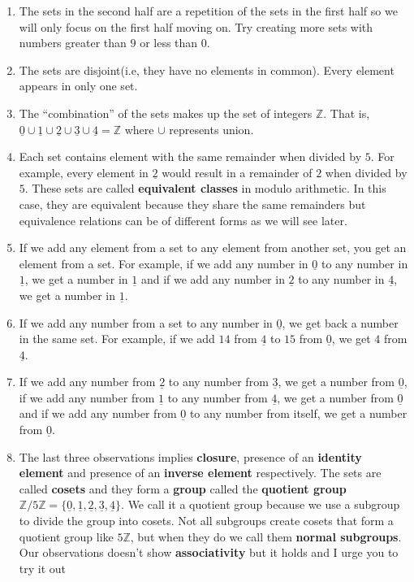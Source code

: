 \documentclass[11pt]{article}
\providecommand{\tightlist}{%
      \setlength{\itemsep}{0pt}\setlength{\parskip}{0pt}}
\begin{document}
\begin{enumerate}
\def\labelenumi{\arabic{enumi}.}
\tightlist
\item
  The sets in the second half are a repetition of the sets in the first
  half so we will only focus on the first half moving on. Try creating
  more sets with numbers greater than \(9\) or less than \(0\).
\item
  The sets are disjoint(i.e, they have no elements in common). Every
  element appears in only one set.
\item
  The ``combination'' of the sets makes up the set of integers
  \(\mathbb{Z}\). That is,
  \(\underline{0} \cup \underline{1} \cup \underline{2} \cup \underline{3} \cup \underline{4} = \mathbb{Z}\)
  where \(\cup\) represents union.
\item
  Each set contains element with the same remainder when divided by
  \(5\). For example, every element in \(\underline{2}\) would result in
  a remainder of \(2\) when divided by \(5\). These sets are called
  \textbf{equivalent classes} in modulo arithmetic. In this case, they
  are equivalent because they share the same remainders but equivalence
  relations can be of different forms as we will see later.
\item
  If we add any element from a set to any element from another set, you
  get an element from a set. For example, if we add any number in
  \(\underline{0}\) to any number in \(\underline{1}\), we get a number
  in \(\underline{1}\) and if we add any number in \(\underline{2}\) to
  any number in \(\underline{4}\), we get a number in \(\underline{1}\).
\item
  If we add any number from a set to any number in \(\underline{0}\), we
  get back a number in the same set. For example, if we add \(14\) from
  \(\underline{4}\) to \(15\) from \(\underline{0}\), we get \(4\) from
  \(\underline{4}\).
\item
  If we add any number from \(\underline{2}\) to any number from
  \(\underline{3}\), we get a number from \(\underline{0}\), if we add
  any number from \(\underline{1}\) to any number from
  \(\underline{4}\), we get a number from \(\underline{0}\) and if we
  add any number from \(\underline{0}\) to any number from itself, we
  get a number from \(\underline{0}\).
\item
  The last three observations implies \textbf{closure}, presence of an
  \textbf{identity element} and presence of an \textbf{inverse element}
  respectively. The sets are called \textbf{cosets} and they form a
  \textbf{group} called the \textbf{quotient group}
  \(\mathbb{Z}/5\mathbb{Z} = \{\underline{0}, \underline{1}, \underline{2}, \underline{3}, \underline{4}\}\).
  We call it a quotient group because we use a subgroup to divide the
  group into cosets. Not all subgroups create cosets that form a
  quotient group like \(5\mathbb{Z}\), but when they do we call them
  \textbf{normal subgroups}. Our observations doesn't show
  \textbf{associativity} but it holds and I urge you to try it out
\end{enumerate}
\end{document}
